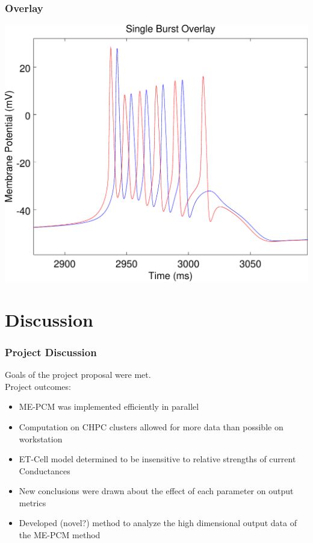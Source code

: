 \documentclass{beamer}
\theoremstyle{plain}
\theoremstyle{definition}
\begin{document}
\begin{frame}\frametitle{Overlay}
  \begin{center}
    \includegraphics[scale=.5]{SingleBurstOverlay.pdf}%
  \end{center}
\end{frame}

\section{Discussion}

\begin{frame}\frametitle{Project Discussion}
  Goals of the project proposal were met.\\
  \vspace{1em}
  Project outcomes:
  \begin{itemize}
    \item ME-PCM was implemented efficiently in parallel
    \item Computation on CHPC clusters allowed for more data than possible on workstation
    \item ET-Cell model determined to be insensitive to relative strengths of current Conductances
    \item New conclusions were drawn about the effect of each parameter on output metrics
    \item Developed (novel?) method to analyze the high dimensional output data of the ME-PCM method
  \end{itemize}
\end{frame}
\end{document}
